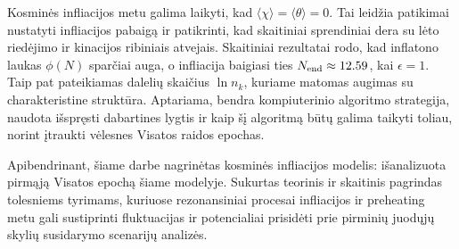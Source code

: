 Kosminės infliacijos metu galima laikyti, kad $\langle\chi\rangle=\langle\theta\rangle=0$. Tai leidžia patikimai nustatyti infliacijos pabaigą ir patikrinti, kad skaitiniai sprendiniai dera su lėto riedėjimo ir kinacijos ribiniais atvejais. Skaitiniai rezultatai rodo, kad inflatono laukas $\phi(N)$ sparčiai auga, o infliacija baigiasi ties $N_{\rm end}\approx 12.59$, kai $\epsilon=1$. Taip pat pateikiamas dalelių skaičius $\ln n_k$, kuriame matomas augimas su charakteristine struktūra. Aptariama, bendra kompiuterinio algoritmo strategija, naudota išspręsti dabartines lygtis ir kaip šį algoritmą būtų galima taikyti toliau, norint įtraukti vėlesnes Visatos raidos epochas. 

Apibendrinant, šiame darbe nagrinėtas kosminės infliacijos modelis:
išanalizuota pirmąją Visatos epochą šiame modelyje. Sukurtas teorinis ir skaitinis pagrindas tolesniems tyrimams, kuriuose rezonansiniai procesai infliacijos ir preheating metu gali sustiprinti fluktuacijas ir potencialiai prisidėti prie pirminių juodųjų skylių susidarymo scenarijų analizės.
